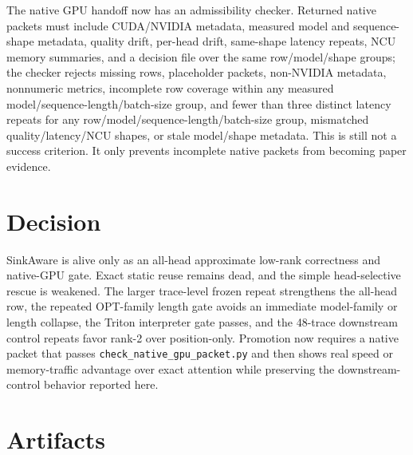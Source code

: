 \documentclass{article}
\begin{document}
The native GPU handoff now has an admissibility checker. Returned native
packets must include CUDA/NVIDIA metadata, measured model and sequence-shape metadata, quality drift, per-head drift,
same-shape latency repeats, NCU memory summaries, and a decision file over the same row/model/shape groups; the checker rejects
missing rows, placeholder packets, non-NVIDIA metadata, nonnumeric metrics,
incomplete row coverage within any measured model/sequence-length/batch-size group, and
fewer than three distinct latency repeats for any row/model/sequence-length/batch-size group, mismatched quality/latency/NCU shapes, or stale model/shape metadata. This is still not a success
criterion. It only prevents incomplete native packets from becoming paper
evidence.

\section{Decision}

SinkAware is alive only as an all-head approximate low-rank correctness and native-GPU gate. Exact static reuse remains dead, and the simple head-selective rescue is weakened. The larger trace-level frozen repeat strengthens the all-head row, the repeated OPT-family length gate avoids an immediate model-family or length collapse, the Triton interpreter gate passes, and the 48-trace downstream control repeats favor rank-2 over position-only. Promotion now requires a native packet that passes \texttt{check\_native\_gpu\_packet.py} and then shows real speed or memory-traffic advantage over exact attention while preserving the downstream-control behavior reported here.

\section{Artifacts}
\end{document}
